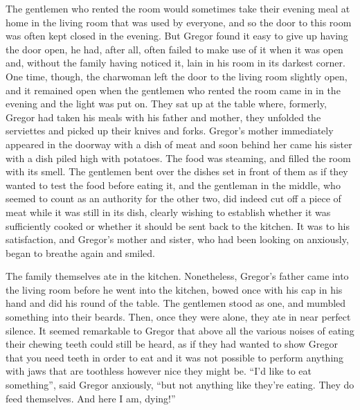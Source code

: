 The gentlemen who rented the room would sometimes take their evening
meal at home in the living room that was used by everyone, and so the
door to this room was often kept closed in the evening. But Gregor
found it easy to give up having the door open, he had, after all, often
failed to make use of it when it was open and, without the family
having noticed it, lain in his room in its darkest corner. One time,
though, the charwoman left the door to the living room slightly open,
and it remained open when the gentlemen who rented the room came in in
the evening and the light was put on. They sat up at the table where,
formerly, Gregor had taken his meals with his father and mother, they
unfolded the serviettes and picked up their knives and forks. Gregor’s
mother immediately appeared in the doorway with a dish of meat and soon
behind her came his sister with a dish piled high with potatoes. The
food was steaming, and filled the room with its smell. The gentlemen
bent over the dishes set in front of them as if they wanted to test the
food before eating it, and the gentleman in the middle, who seemed to
count as an authority for the other two, did indeed cut off a piece of
meat while it was still in its dish, clearly wishing to establish
whether it was sufficiently cooked or whether it should be sent back to
the kitchen. It was to his satisfaction, and Gregor’s mother and
sister, who had been looking on anxiously, began to breathe again and
smiled.

The family themselves ate in the kitchen. Nonetheless, Gregor’s father
came into the living room before he went into the kitchen, bowed once
with his cap in his hand and did his round of the table. The gentlemen
stood as one, and mumbled something into their beards. Then, once they
were alone, they ate in near perfect silence. It seemed remarkable to
Gregor that above all the various noises of eating their chewing teeth
could still be heard, as if they had wanted to show Gregor that you
need teeth in order to eat and it was not possible to perform anything
with jaws that are toothless however nice they might be. “I’d like to
eat something”, said Gregor anxiously, “but not anything like they’re
eating. They do feed themselves. And here I am, dying!”

